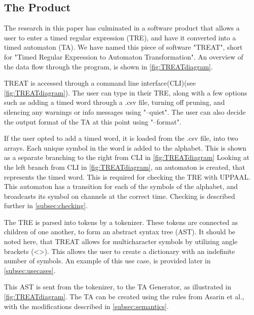 \subsection{The Product}\label{subsec:theProduct}
The research in this paper has culminated in a software product that allows a user to enter a timed regular expression (TRE), and have it converted into a timed automaton (TA).
We have named this piece of software "TREAT", short for "Timed Regular Expression to Automaton Transformation".
An overview of the data flow through the program, is shown in \cref{fig:TREATdiagram}.



TREAT is accessed through a command line interface(CLI)(see \cref*{fig:TREATdiagram}). The user can type in their TRE, along with a few options such as adding a timed word through a .csv file, turning off pruning, and silencing any warnings or info messages using "--quiet".
The user can also decide the output format of the TA at this point using "--format".

If the user opted to add a timed word, it is loaded from the .csv file, into two arrays. Each unique symbol in the word is added to the alphabet. This is shown as a separate branching to the right from CLI in \cref*{fig:TREATdiagram}
Looking at the left branch from CLI in \cref*{fig:TREATdiagram}, an automaton is created, that represents the timed word. This is required for checking the TRE with UPPAAL. This automaton has a transition for each of the symbols of the alphabet, and broadcasts its symbol on channels at the correct time. Checking is described further in \cref{subsec:checking}.

The TRE is parsed into tokens by a tokenizer. These tokens are connected as children of one another, to form an abstract syntax tree (AST). 
It should be noted here, that TREAT allows for multicharacter symbols by utilizing angle brackets (<>). This allows the user to create a dictionary with an indefinite number of symbols. An example of this use case, is provided later in \cref{subsec:usecases}.

This AST is sent from the tokenizer, to the TA Generator, as illustrated in \cref*{fig:TREATdiagram}. The TA can be created using the rules from Asarin et al., with the modifications described in \cref{subsec:semantics}.

